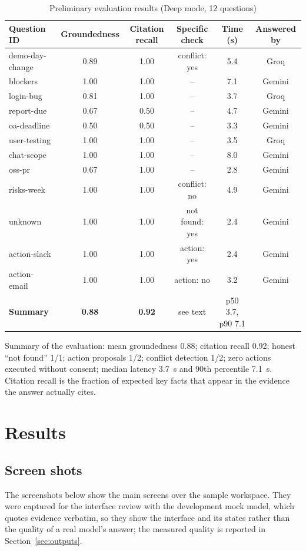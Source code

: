 \documentclass[oneside,a4paper,12pt]{report}
\begin{document}
\begin{table}[!htbp]
\begin{center}
\def\arraystretch{1.2}
\small
\begin{tabular}{| l | c | c | c | c | c |}
\hline
Question ID & Groundedness & Citation recall & Specific check & Time (s) & Answered by \\ \hline
demo-day-change & 0.89 & 1.00 & conflict: yes & 5.4 & Groq \\ \hline
blockers & 1.00 & 1.00 & -- & 7.1 & Gemini \\ \hline
login-bug & 0.81 & 1.00 & -- & 3.7 & Groq \\ \hline
report-due & 0.67 & 0.50 & -- & 4.7 & Gemini \\ \hline
oa-deadline & 0.50 & 0.50 & -- & 3.3 & Gemini \\ \hline
user-testing & 1.00 & 1.00 & -- & 3.5 & Groq \\ \hline
chat-scope & 1.00 & 1.00 & -- & 8.0 & Gemini \\ \hline
oss-pr & 0.67 & 1.00 & -- & 2.8 & Gemini \\ \hline
risks-week & 1.00 & 1.00 & conflict: no & 4.9 & Gemini \\ \hline
unknown & 1.00 & 1.00 & not found: yes & 2.4 & Gemini \\ \hline
action-slack & 1.00 & 1.00 & action: yes & 2.4 & Gemini \\ \hline
action-email & 1.00 & 1.00 & action: no & 3.2 & Gemini \\ \hline
\textbf{Summary} & \textbf{0.88} & \textbf{0.92} & see text & p50 3.7, p90 7.1 & \\ \hline
\end{tabular}
\end{center}
\caption{Preliminary evaluation results (Deep mode, 12 questions)}
\label{tab:eval}
\end{table}

Summary of the evaluation: mean groundedness 0.88; citation recall 0.92; honest ``not found'' 1/1; action proposals 1/2; conflict detection 1/2; zero actions executed without consent; median latency 3.7~s and 90th percentile 7.1~s. Citation recall is the fraction of expected key facts that appear in the evidence the answer actually cites.

\chapter{Results}
\label{ch:results}
\section{Screen shots}
The screenshots below show the main screens over the sample workspace. They were captured for the interface review with the development mock model, which quotes evidence verbatim, so they show the interface and its states rather than the quality of a real model's answer; the measured quality is reported in Section~\ref{sec:outputs}.
\end{document}
